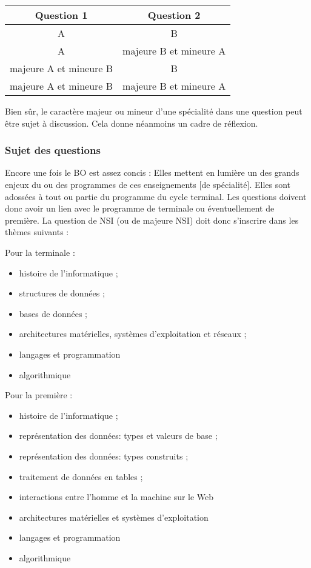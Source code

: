 \documentclass[
  a4paper,
  DIV=11,
  numbers=noendperiod]{scrartcl}
\providecommand{\tightlist}{%
  \setlength{\itemsep}{0pt}\setlength{\parskip}{0pt}}\usepackage{longtable,booktabs,array}
\begin{document}
\begin{longtable}[]{@{}cc@{}}
\toprule\noalign{}
Question 1 & Question 2 \\
\midrule\noalign{}
\endhead
\bottomrule\noalign{}
\endlastfoot
A & B \\
A & majeure B et mineure A \\
majeure A et mineure B & B \\
majeure A et mineure B & majeure B et mineure A \\
\end{longtable}

Bien sûr, le caractère majeur ou mineur d'une spécialité dans une
question peut être sujet à discussion. Cela donne néanmoins un cadre de
réflexion.

\hypertarget{sujet-des-questions}{%
\subsubsection{Sujet des questions}\label{sujet-des-questions}}

Encore une fois le BO est assez concis : Elles mettent en lumière un des
grands enjeux du ou des programmes de ces enseignements {[}de
spécialité{]}. Elles sont adossées à tout ou partie du programme du
cycle terminal. Les questions doivent donc avoir un lien avec le
programme de terminale ou éventuellement de première. La question de NSI
(ou de majeure NSI) doit donc s'inscrire dans les thèmes suivants :

Pour la terminale :

\begin{itemize}
\tightlist
\item
  histoire de l'informatique ;
\item
  structures de données ;
\item
  bases de données ;
\item
  architectures matérielles, systèmes d'exploitation et réseaux ;
\item
  langages et programmation
\item
  algorithmique
\end{itemize}

Pour la première :

\begin{itemize}
\tightlist
\item
  histoire de l'informatique ;
\item
  représentation des données: types et valeurs de base ;
\item
  représentation des données: types construits ;
\item
  traitement de données en tables ;
\item
  interactions entre l'homme et la machine sur le Web
\item
  architectures matérielles et systèmes d'exploitation
\item
  langages et programmation
\item
  algorithmique
\end{itemize}
\end{document}
